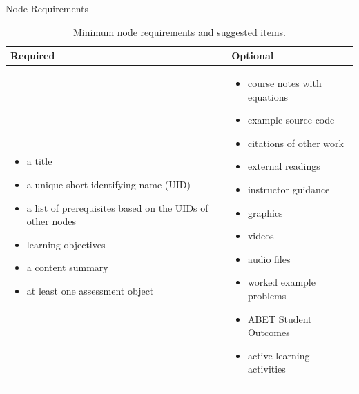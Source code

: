 \documentclass[final]{beamer}
\newlength{\onecolwid}
\newlength{\threecolwid}
\begin{document}
\begin{frame}[t]
\begin{columns}[t,totalwidth=\threecolwid]
\begin{column}{\onecolwid}
\begin{block}{Node Requirements}
        \begin{table}
                \centering
        \begin{tabularx}{\textwidth}{X |X}
                        \hline
                        \textbf{Required} & \textbf{Optional}\\
                        \hline
        \begin{itemize}
        \item a title
        \item a unique short identifying name (UID)
        \item a list of prerequisites based on the UIDs of other nodes
        \item learning objectives
        \item a content summary
        \item at least one assessment object
        \end{itemize} & 
        \begin{itemize}
        \item course notes with equations
        \item example source code
        \item citations of other work
        \item external readings
        \item instructor guidance
        \item graphics
        \item videos
        \item audio files 
        \item worked example problems
        \item ABET Student Outcomes
        \item active learning activities
        \end{itemize}\\
                \end{tabularx}
                \caption{Minimum node requirements and suggested items.}
                \label{tab:node}
        \end{table}

\end{block}


\end{column} %


\end{columns}
\end{frame}
\end{document}
